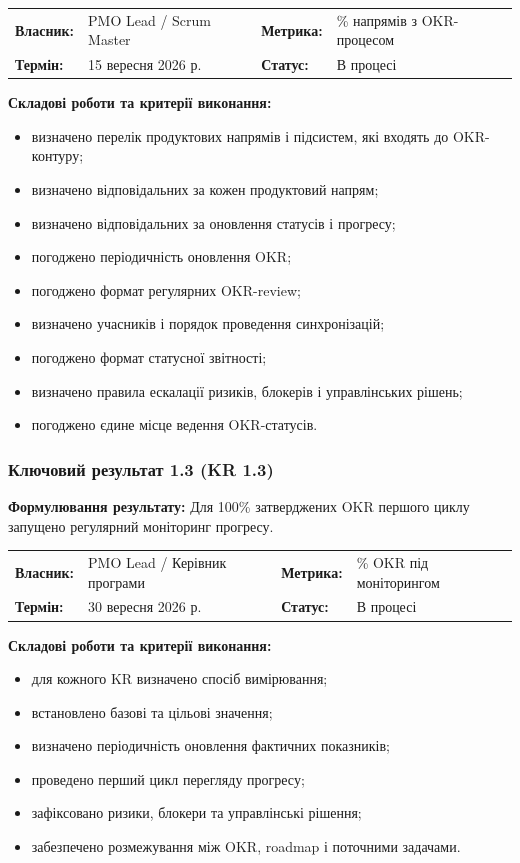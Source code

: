 \documentclass{article}
\begin{document}
\noindent\begin{tabular}{@{}p{2.2cm}p{4.5cm}p{2.2cm}p{4.5cm}@{}}
\toprule
\textbf{Власник:} & PMO Lead / Scrum Master & \textbf{Метрика:} & \% напрямів з OKR-процесом \\
\textbf{Термін:} & 15 вересня 2026 р. & \textbf{Статус:} & В процесі \\
\bottomrule
\end{tabular}

\vspace{10pt}
\textbf{Складові роботи та критерії виконання:}
\begin{itemize}
    \item визначено перелік продуктових напрямів і підсистем, які входять до OKR-контуру;
    \item визначено відповідальних за кожен продуктовий напрям;
    \item визначено відповідальних за оновлення статусів і прогресу;
    \item погоджено періодичність оновлення OKR;
    \item погоджено формат регулярних OKR-review;
    \item визначено учасників і порядок проведення синхронізацій;
    \item погоджено формат статусної звітності;
    \item визначено правила ескалації ризиків, блокерів і управлінських рішень;
    \item погоджено єдине місце ведення OKR-статусів.
\end{itemize}

\subsubsection{Ключовий результат 1.3 (KR 1.3)}

\textbf{Формулювання результату:} Для 100\% затверджених OKR першого циклу запущено регулярний моніторинг прогресу.

\noindent\begin{tabular}{@{}p{2.2cm}p{4.5cm}p{2.2cm}p{4.5cm}@{}}
\toprule
\textbf{Власник:} & PMO Lead / Керівник програми & \textbf{Метрика:} & \% OKR під моніторингом \\
\textbf{Термін:} & 30 вересня 2026 р. & \textbf{Статус:} & В процесі \\
\bottomrule
\end{tabular}

\vspace{10pt}
\textbf{Складові роботи та критерії виконання:}
\begin{itemize}
    \item для кожного KR визначено спосіб вимірювання;
    \item встановлено базові та цільові значення;
    \item визначено періодичність оновлення фактичних показників;
    \item проведено перший цикл перегляду прогресу;
    \item зафіксовано ризики, блокери та управлінські рішення;
    \item забезпечено розмежування між OKR, roadmap і поточними задачами.
\end{itemize}
\end{document}
